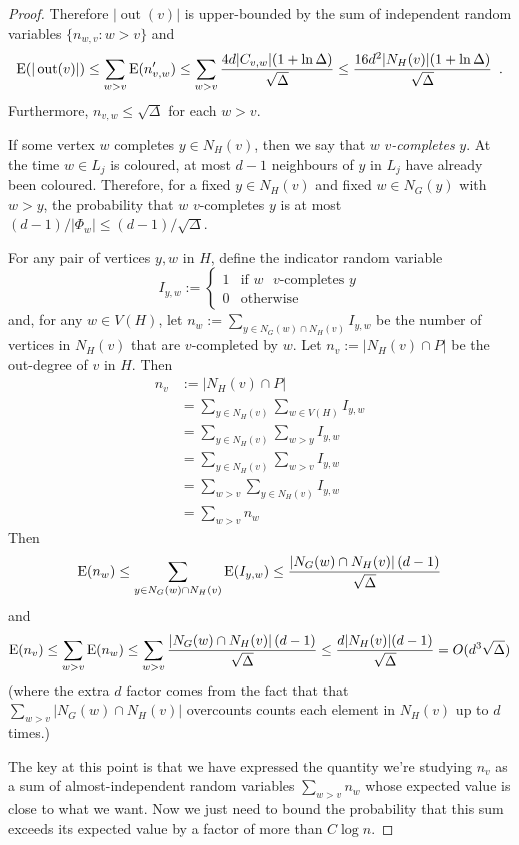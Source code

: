 \documentclass[kpfonts]{patmorin}
\newcommand{\defin}[1]{\emph{\color{brightmaroon}#1}}
\DeclareMathOperator{\outn}{out}
\begin{document}
\begin{proof}
  Therefore $|\outn(v)|$ is upper-bounded by the sum of independent random variables $\{n_{w,v}:w>v\}$ and
  \[
     \E(|\outn(v)|) \le \sum_{w>v} \E(n'_{v,w})
     \le \sum_{w>v}\frac{4d|C_{v,w}|(1+\ln\Delta)}{\sqrt{\Delta}}
     \le \frac{16d^2|N_{H}(v)|(1+\ln\Delta)}{\sqrt{\Delta}} \enspace .
  \]
  Furthermore, $n_{v,w}\le\sqrt{\Delta}$ for each $w>v$.





  If some vertex $w$ completes $y\in N_H(v) $, then we say that $w$ \defin{$v$-completes} $y$.  At the time $w\in L_j$ is coloured, at most $d-1$ neighbours of $y$ in $L_j$ have already been coloured.  Therefore, for a fixed $y\in N_H(v)$ and fixed $w\in N_G(y)$ with $w>y$, the probability that $w$ $v$-completes $y$ is at most $(d-1)/|\Phi_w|\le (d-1)/\sqrt{\Delta}$.

  For any pair of vertices $y,w$ in $H$, define the indicator random variable
  \[
    I_{y,w} := \begin{cases}
      1 & \text{if $w$ $v$-completes $y$} \\
      0 & \text{otherwise}
    \end{cases}
  \]
  and, for any $w\in V(H)$, let $n_w:=\sum_{y\in N_G(w)\cap N_H(v)} I_{y,w}$ be the number of vertices in $N_H(v)$ that are $v$-completed by $w$.  Let $n_v:=|N_H(v)\cap P|$ be the out-degree of $v$ in $H$.  Then
  \begin{align*}  n_v
    & :=|N_H(v)\cap P| \\
    & = \sum_{y\in N_H(v)} \sum_{w\in V(H)}  I_{y,w} \\
    & = \sum_{y\in N_H(v)} \sum_{w>y}  I_{y,w} \\
    & = \sum_{y\in N_H(v)} \sum_{w>v}  I_{y,w} \\
    & = \sum_{w>v} \sum_{y\in N_H(v)} I_{y,w} \\
    & = \sum_{w>v} n_w
  \end{align*}
  Then
  \[
      \mathrm{E}(n_w) \le \sum_{y\in N_G(w)\cap N_H(v)} \mathrm{E}(I_{y,w})
      \le \frac{|N_G(w)\cap N_H(v)|\, (d-1)}{\sqrt{\Delta}}
  \]
  and
  \[
      \mathrm{E}(n_v) \le \sum_{w>v} \mathrm{E}(n_w)
      \le \sum_{w>v} \frac{|N_G(w)\cap N_H(v)|\, (d-1)}{\sqrt{\Delta}}
      \le \frac{d|N_H(v)|(d-1)}{\sqrt{\Delta}} = O(d^3\sqrt{\Delta})
  \]
  (where the extra $d$ factor comes from the fact that that $\sum_{w>v}|N_G(w)\cap N_H(v)|$ overcounts counts each element in $N_H(v)$ up to $d$ times.)

  The key at this point is that we have expressed the quantity we're studying $n_v$ as a sum of almost-independent random variables $\sum_{w> v} n_w$ whose expected value is close to what we want.  Now we just need to bound the probability that this sum exceeds its expected value by a factor of more than $C\log n$.
\end{proof}
\end{document}
